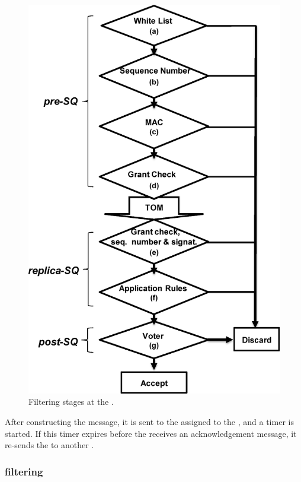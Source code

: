 \begin{figure}[!t]
\centering
\includegraphics[scale=0.5]{images/images/filtering_steps_1.pdf}
\caption{\small Filtering stages at the \sieveq.}
\label{fig:filters}
\end{figure}


After constructing the message, it is sent to the \presieve assigned to the \sender, and a timer is started.
If this timer expires before the \sender receives an acknowledgement message, it re-sends the \msg to another \presieve.

\subsubsection{\Presieve filtering}


